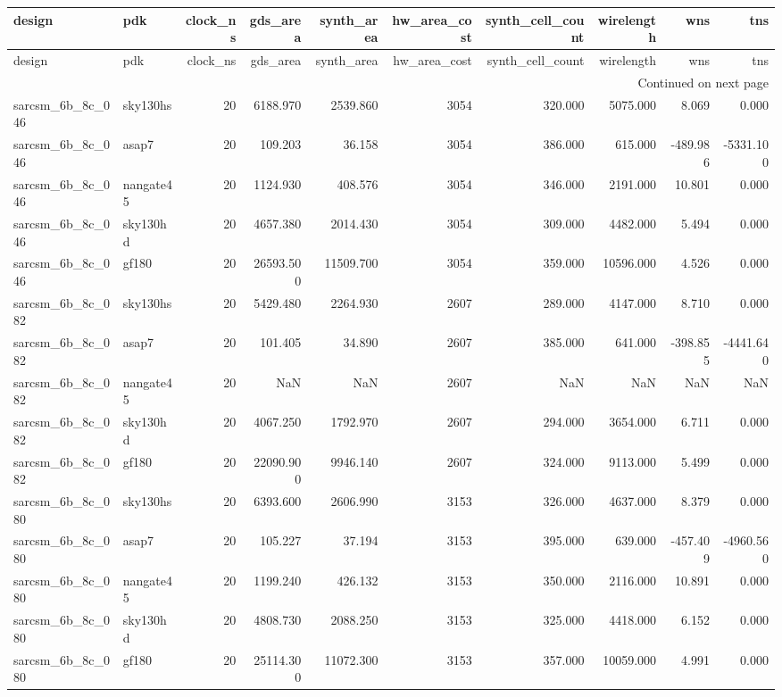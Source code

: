 \begin{longtable}{llrrrrrrrr}
\toprule
design & pdk & clock\_ns & gds\_area & synth\_area & hw\_area\_cost & synth\_cell\_count & wirelength & wns & tns \\
\midrule
\endfirsthead
\toprule
design & pdk & clock\_ns & gds\_area & synth\_area & hw\_area\_cost & synth\_cell\_count & wirelength & wns & tns \\
\midrule
\endhead
\midrule
\multicolumn{10}{r}{Continued on next page} \\
\midrule
\endfoot
\bottomrule
\endlastfoot
sarcsm\_6b\_8c\_046 & sky130hs & 20 & 6188.970 & 2539.860 & 3054 & 320.000 & 5075.000 & 8.069 & 0.000 \\
sarcsm\_6b\_8c\_046 & asap7 & 20 & 109.203 & 36.158 & 3054 & 386.000 & 615.000 & -489.986 & -5331.100 \\
sarcsm\_6b\_8c\_046 & nangate45 & 20 & 1124.930 & 408.576 & 3054 & 346.000 & 2191.000 & 10.801 & 0.000 \\
sarcsm\_6b\_8c\_046 & sky130hd & 20 & 4657.380 & 2014.430 & 3054 & 309.000 & 4482.000 & 5.494 & 0.000 \\
sarcsm\_6b\_8c\_046 & gf180 & 20 & 26593.500 & 11509.700 & 3054 & 359.000 & 10596.000 & 4.526 & 0.000 \\
sarcsm\_6b\_8c\_082 & sky130hs & 20 & 5429.480 & 2264.930 & 2607 & 289.000 & 4147.000 & 8.710 & 0.000 \\
sarcsm\_6b\_8c\_082 & asap7 & 20 & 101.405 & 34.890 & 2607 & 385.000 & 641.000 & -398.855 & -4441.640 \\
sarcsm\_6b\_8c\_082 & nangate45 & 20 & NaN & NaN & 2607 & NaN & NaN & NaN & NaN \\
sarcsm\_6b\_8c\_082 & sky130hd & 20 & 4067.250 & 1792.970 & 2607 & 294.000 & 3654.000 & 6.711 & 0.000 \\
sarcsm\_6b\_8c\_082 & gf180 & 20 & 22090.900 & 9946.140 & 2607 & 324.000 & 9113.000 & 5.499 & 0.000 \\
sarcsm\_6b\_8c\_080 & sky130hs & 20 & 6393.600 & 2606.990 & 3153 & 326.000 & 4637.000 & 8.379 & 0.000 \\
sarcsm\_6b\_8c\_080 & asap7 & 20 & 105.227 & 37.194 & 3153 & 395.000 & 639.000 & -457.409 & -4960.560 \\
sarcsm\_6b\_8c\_080 & nangate45 & 20 & 1199.240 & 426.132 & 3153 & 350.000 & 2116.000 & 10.891 & 0.000 \\
sarcsm\_6b\_8c\_080 & sky130hd & 20 & 4808.730 & 2088.250 & 3153 & 325.000 & 4418.000 & 6.152 & 0.000 \\
sarcsm\_6b\_8c\_080 & gf180 & 20 & 25114.300 & 11072.300 & 3153 & 357.000 & 10059.000 & 4.991 & 0.000 \\

\end{longtable}
